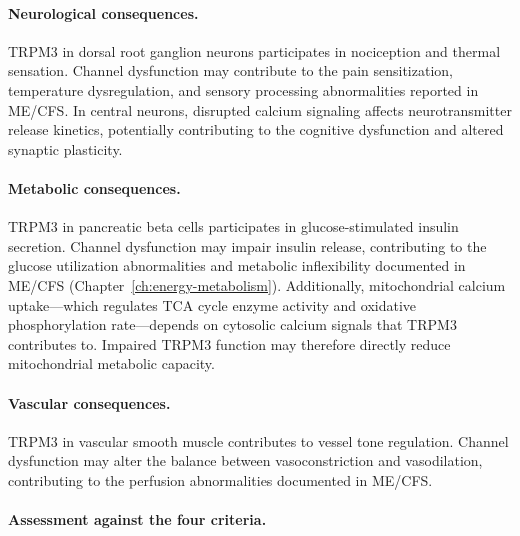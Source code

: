 \paragraph{Neurological consequences.} TRPM3 in dorsal root ganglion neurons participates in nociception and thermal sensation. Channel dysfunction may contribute to the pain sensitization, temperature dysregulation, and sensory processing abnormalities reported in ME/CFS. In central neurons, disrupted calcium signaling affects neurotransmitter release kinetics, potentially contributing to the cognitive dysfunction and altered synaptic plasticity.

\paragraph{Metabolic consequences.} TRPM3 in pancreatic beta cells participates in glucose-stimulated insulin secretion. Channel dysfunction may impair insulin release, contributing to the glucose utilization abnormalities and metabolic inflexibility documented in ME/CFS (Chapter~\ref{ch:energy-metabolism}). Additionally, mitochondrial calcium uptake---which regulates TCA cycle enzyme activity and oxidative phosphorylation rate---depends on cytosolic calcium signals that TRPM3 contributes to. Impaired TRPM3 function may therefore directly reduce mitochondrial metabolic capacity.

\paragraph{Vascular consequences.} TRPM3 in vascular smooth muscle contributes to vessel tone regulation. Channel dysfunction may alter the balance between vasoconstriction and vasodilation, contributing to the perfusion abnormalities documented in ME/CFS.

\paragraph{Assessment against the four criteria.}

